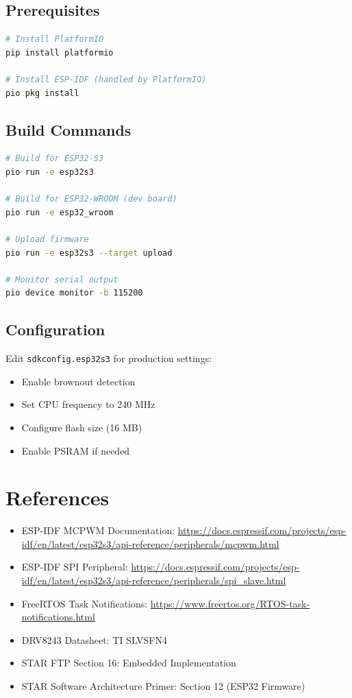 \documentclass[11pt,letterpaper]{article}
\begin{document}
\subsection{Prerequisites}

\begin{lstlisting}[language=bash]
# Install PlatformIO
pip install platformio

# Install ESP-IDF (handled by PlatformIO)
pio pkg install
\end{lstlisting}

\subsection{Build Commands}

\begin{lstlisting}[language=bash]
# Build for ESP32-S3
pio run -e esp32s3

# Build for ESP32-WROOM (dev board)
pio run -e esp32_wroom

# Upload firmware
pio run -e esp32s3 --target upload

# Monitor serial output
pio device monitor -b 115200
\end{lstlisting}

\subsection{Configuration}

Edit \texttt{sdkconfig.esp32s3} for production settings:
\begin{itemize}
    \item Enable brownout detection
    \item Set CPU frequency to 240 MHz
    \item Configure flash size (16 MB)
    \item Enable PSRAM if needed
\end{itemize}

\section{References}

\begin{itemize}
    \item ESP-IDF MCPWM Documentation: \url{https://docs.espressif.com/projects/esp-idf/en/latest/esp32s3/api-reference/peripherals/mcpwm.html}
    \item ESP-IDF SPI Peripheral: \url{https://docs.espressif.com/projects/esp-idf/en/latest/esp32s3/api-reference/peripherals/spi_slave.html}
    \item FreeRTOS Task Notifications: \url{https://www.freertos.org/RTOS-task-notifications.html}
    \item DRV8243 Datasheet: TI SLVSFN4
    \item STAR FTP Section 16: Embedded Implementation
    \item STAR Software Architecture Primer: Section 12 (ESP32 Firmware)
\end{itemize}
\end{document}
